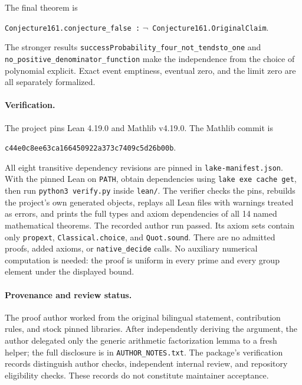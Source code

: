 \documentclass[11pt]{article}
\begin{document}
The final theorem is
\begin{center}
\texttt{Conjecture161.conjecture\_false :}\quad
\texttt{$\neg$ Conjecture161.OriginalClaim}.
\end{center}
The stronger results
\nolinkurl{successProbability_four_not_tendsto_one} and
\nolinkurl{no_positive_denominator_function} make the independence from the
choice of polynomial explicit. Exact event emptiness, eventual zero, and the
limit zero are all separately formalized.

\paragraph{Verification.}
The project pins Lean 4.19.0 and Mathlib v4.19.0. The Mathlib commit is
\begin{center}
\texttt{c44e0c8ee63ca166450922a373c7409c5d26b00b}.
\end{center}
All eight transitive dependency
revisions are pinned in \texttt{lake-manifest.json}. With the pinned Lean on
\texttt{PATH}, obtain dependencies using \texttt{lake exe cache get}, then run
\texttt{python3 verify.py} inside \texttt{lean/}.
The verifier checks the pins, rebuilds the project's own generated objects,
replays all Lean files with warnings treated as errors, and prints the full
types and axiom dependencies of all 14 named mathematical theorems.
The recorded author run passed. Its axiom sets contain only
\texttt{propext}, \texttt{Classical.choice}, and \texttt{Quot.sound}.
There are no admitted proofs, added axioms, or \texttt{native\_decide} calls.
No auxiliary numerical computation is needed: the proof is uniform in every
prime and every group element under the displayed bound.

\paragraph{Provenance and review status.}
The proof author worked from the original bilingual statement, contribution
rules, and stock pinned libraries. After independently deriving the argument,
the author delegated only the generic arithmetic factorization lemma to a
fresh helper; the full disclosure is in \texttt{AUTHOR\_NOTES.txt}. The package's
verification records distinguish author checks, independent internal review,
and repository eligibility checks. These records do not constitute maintainer
acceptance.
\end{document}
